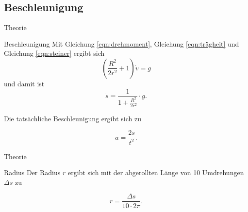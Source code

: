 \subsection{Beschleunigung}
\begin{frame}{Theorie}
    \begin{block}{Beschleunigung}
    Mit Gleichung \eqref{eqn:drehmoment}, Gleichung \eqref{eqn:trägheit} und Gleichung \eqref{eqn:steiner} ergibt sich
    \begin{equation*}
        (\frac{R^2}{2 r^2} +1) \dot{v} = g
    \end{equation*}
   und damit ist  
    \begin{equation*}
        \ddot{s} = \frac{1}{1 + \frac{R^2}{2r^2}} \cdot g.
    \end{equation*}

    Die tatsächliche Beschleunigung ergibt sich zu 
    
    \begin{equation*}
        a = \frac{2s}{t^2}.
    \end{equation*}
    \end{block}
\end{frame}

\begin{frame}{Theorie}
    \begin{block}{Radius}
    Der Radius $r$ ergibt sich mit der abgerollten Länge von 10 Umdrehungen $\Delta s$ zu

    \begin{equation*}
        r = \frac{\Delta s}{10 \cdot 2\pi}.
    \end{equation*}
    \end{block}
\end{frame}
